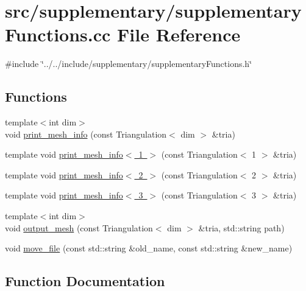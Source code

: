 \section{src/supplementary/supplementary\+Functions.cc File Reference}
\label{supplementary_functions_8cc}
{\ttfamily \#include \char`\"{}../../include/supplementary/supplementary\+Functions.\+h\char`\"{}}\newline
\subsection*{Functions}
\begin{DoxyCompactItemize}
\item 
{\footnotesize template$<$int dim$>$ }\\void \mbox{\hyperlink{group___supplementary_ga2971a293263dddc17f3df81add2ffbbe}{print\+\_\+mesh\+\_\+info}} (const Triangulation$<$ dim $>$ \&tria)
\item 
template void \mbox{\hyperlink{supplementary_functions_8cc_a27ee4a9830113522595a507a921b56e5}{print\+\_\+mesh\+\_\+info$<$ 1 $>$}} (const Triangulation$<$ 1 $>$ \&tria)
\item 
template void \mbox{\hyperlink{supplementary_functions_8cc_a26717733da51a761f009de3a1e57cf15}{print\+\_\+mesh\+\_\+info$<$ 2 $>$}} (const Triangulation$<$ 2 $>$ \&tria)
\item 
template void \mbox{\hyperlink{supplementary_functions_8cc_a6bd7935769f623c78960b765b08865c2}{print\+\_\+mesh\+\_\+info$<$ 3 $>$}} (const Triangulation$<$ 3 $>$ \&tria)
\item 
{\footnotesize template$<$int dim$>$ }\\void \mbox{\hyperlink{group___supplementary_ga0272b346b175b931e89b017fd93b5b80}{output\+\_\+mesh}} (const Triangulation$<$ dim $>$ \&tria, std\+::string path)
\item 
void \mbox{\hyperlink{group___supplementary_gae0eb2d2afc3e33a9bb3b409b0171c470}{move\+\_\+file}} (const std\+::string \&old\+\_\+name, const std\+::string \&new\+\_\+name)
\end{DoxyCompactItemize}


\subsection{Function Documentation}
\mbox{\label{supplementary_functions_8cc_a27ee4a9830113522595a507a921b56e5}} 
